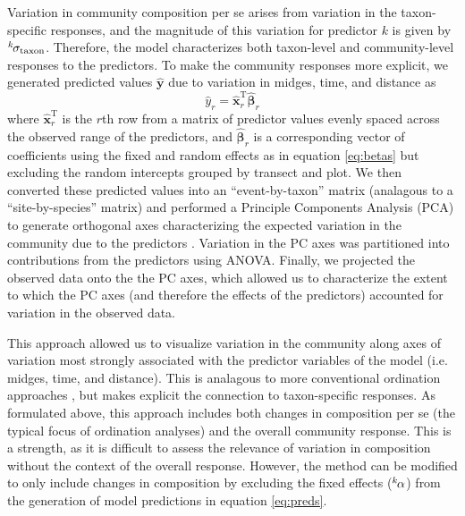 Variation in community composition per se arises from variation in the taxon-specific
responses, and the magnitude of this
variation for predictor $k$ is given by ${}^k\hspace*{-1pt}\sigma_\text{taxon}$.
Therefore, the model characterizes both
taxon-level and community-level responses to the predictors.
To make the community responses more explicit, we generated predicted values
$\hat{\mathbf{y}}$ due to variation in midges, time, and distance as
%
\begin{equation} \label{eq:preds}
    \hat{y}_r = \hat{\mathbf{x}}_r^\text{T} \hat{{\boldsymbol\beta}}_r
\end{equation}
%
\noindent where $\hat{\mathbf{x}}_r^\text{T}$ is the $r$th row from a matrix
of predictor values evenly spaced across the observed range of the predictors,
and $\hat{{\boldsymbol\beta}}_r$ is a corresponding vector of coefficients
using the fixed and random effects as in equation \ref{eq:betas}
but excluding the random intercepts grouped
by transect and plot.
We then converted these predicted values into an ``event-by-taxon'' matrix
(analagous to a ``site-by-species'' matrix) \citep{Mcgarigal2013}
and performed a Principle Components Analysis (PCA) to
generate orthogonal axes characterizing the expected
variation in the community due to the predictors \citep[similar to][]{Jackson2012}.
Variation in the PC axes was partitioned into contributions from the predictors
using ANOVA.
Finally, we projected the observed data onto the the PC axes,
which allowed us to characterize the extent to which the PC axes
(and therefore the effects of the predictors) accounted for variation in the observed data.

This approach allowed us to visualize variation in the community
along axes of variation most strongly associated with the predictor variables of the model
(i.e. midges, time, and distance).
This is analagous to more conventional ordination approaches \citep{Mcgarigal2013},
but makes explicit the connection to taxon-specific responses.
As formulated above, this approach includes both changes in composition per se
(the typical focus of ordination analyses) and the overall community response.
This is a strength, as it is difficult to assess the relevance of variation in
composition without the context of the overall response.
However, the method can be modified to only include changes in composition
by excluding the fixed effects (${}^k\hspace*{-1pt}\alpha$)
from the generation of model predictions in equation \ref{eq:preds}.

